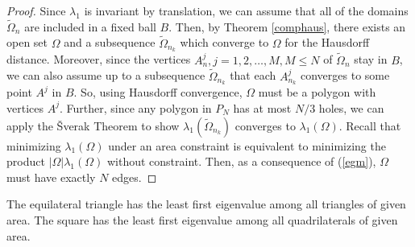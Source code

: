 \begin{proof}
  Since $\lambda_{1}$ is invariant by translation, we can assume that all of the domains $\widetilde{\Omega}_{n}$ are included in a fixed ball $B$.
  Then, by Theorem \ref{comphaus}, there exists an open set $\Omega$ and a subsequence $\widetilde{\Omega}_{n_{k}}$ which converge to $\Omega$ for the Hausdorff distance.
  Moreover, since the vertices $A_{n}^{j}, j = 1,2,\ldots,M, M \leq N$ of $\widetilde{\Omega}_{n}$ stay in $B$, we can also assume up to a subsequence $\widetilde{\Omega}_{n_{k}}$ that each $A_{n_{k}}^{j}$ converges to some point $A^{j}$ in $B$.
  So, using Hausdorff convergence, $\Omega$ must be a polygon with vertices $A^{j}$.
  Further, since any polygon in $P_{N}$ has at most $N / 3$ holes, we can apply the Šverak Theorem to show $\lambda_{1}(\widetilde{\Omega}_{n_{k}})$ converges to $\lambda_{1}(\Omega)$.
  Recall that minimizing $\lambda_{1}(\Omega)$ under an area constraint is equivalent to minimizing the product $| \Omega |\lambda_{1}(\Omega)$ without constraint.
  Then, as a consequence of (\ref{egm}), $\Omega$ must have exactly $N$ edges.
\end{proof}
\begin{theorem}[Pólya]
  The equilateral triangle has the least first eigenvalue among all triangles of given area.
  The square has the least first eigenvalue among all quadrilaterals of given area.
\end{theorem}
